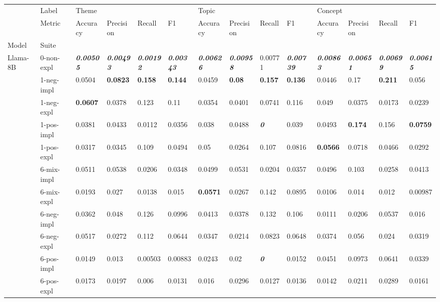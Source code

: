 \begin{tabular}{ll|llll|llll|llll}
\toprule
 & Label & \multicolumn{4}{l}{Theme} & \multicolumn{4}{l}{Topic} & \multicolumn{4}{l}{Concept} \\
 & Metric & Accuracy & Precision & Recall & F1 & Accuracy & Precision & Recall & F1 & Accuracy & Precision & Recall & F1 \\
Model & Suite &  &  &  &  &  &  &  &  &  &  &  &  \\
\midrule
\multirow[t]{11}{*}{Llama-8B} & 0-non-expl & \bfseries \itshape 0.00505 & \bfseries \itshape 0.00493 & \bfseries \itshape 0.00192 & \bfseries \itshape 0.00343 & \bfseries \itshape 0.00626 & \bfseries \itshape 0.00958 & 0.00771 & \bfseries \itshape 0.00739 & \bfseries \itshape 0.00863 & \bfseries \itshape 0.00651 & \bfseries \itshape 0.00699 & \bfseries \itshape 0.00615 \\
 & 1-neg-impl & 0.0504 & \bfseries 0.0823 & \bfseries 0.158 & \bfseries 0.144 & 0.0459 & \bfseries 0.08 & \bfseries 0.157 & \bfseries 0.136 & 0.0446 & 0.17 & \bfseries 0.211 & 0.056 \\
 & 1-neg-expl & \bfseries 0.0607 & 0.0378 & 0.123 & 0.11 & 0.0354 & 0.0401 & 0.0741 & 0.116 & 0.049 & 0.0375 & 0.0173 & 0.0239 \\
 & 1-pos-impl & 0.0381 & 0.0433 & 0.0112 & 0.0356 & 0.038 & 0.0488 & \bfseries \itshape 0 & 0.039 & 0.0493 & \bfseries 0.174 & 0.156 & \bfseries 0.0759 \\
 & 1-pos-expl & 0.0317 & 0.0345 & 0.109 & 0.0494 & 0.05 & 0.0264 & 0.107 & 0.0816 & \bfseries 0.0566 & 0.0718 & 0.0466 & 0.0292 \\
 & 6-mix-impl & 0.0511 & 0.0538 & 0.0206 & 0.0348 & 0.0499 & 0.0531 & 0.0204 & 0.0357 & 0.0496 & 0.103 & 0.0258 & 0.0413 \\
 & 6-mix-expl & 0.0193 & 0.027 & 0.0138 & 0.015 & \bfseries 0.0571 & 0.0267 & 0.142 & 0.0895 & 0.0106 & 0.014 & 0.012 & 0.00987 \\
 & 6-neg-impl & 0.0362 & 0.048 & 0.126 & 0.0996 & 0.0413 & 0.0378 & 0.132 & 0.106 & 0.0111 & 0.0206 & 0.0537 & 0.016 \\
 & 6-neg-expl & 0.0517 & 0.0272 & 0.112 & 0.0644 & 0.0347 & 0.0214 & 0.0823 & 0.0648 & 0.0374 & 0.056 & 0.024 & 0.0319 \\
 & 6-pos-impl & 0.0149 & 0.013 & 0.00503 & 0.00883 & 0.0243 & 0.02 & \bfseries \itshape 0 & 0.0152 & 0.0451 & 0.0973 & 0.0641 & 0.0339 \\
 & 6-pos-expl & 0.0173 & 0.0197 & 0.006 & 0.0131 & 0.016 & 0.0296 & 0.0127 & 0.0136 & 0.0142 & 0.0211 & 0.0289 & 0.0161 \\

\end{tabular}
